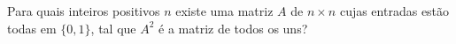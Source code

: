 Para quais inteiros positivos \(n\) existe uma matriz \(A\) de \(n \times n\) cujas entradas estão todas em \(\{0, 1\}\), tal que \(A^2\) é a matriz de todos os uns?
